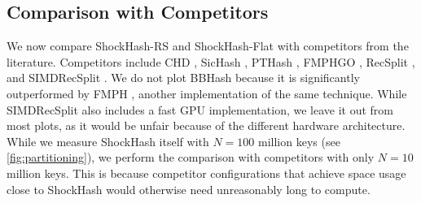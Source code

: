 \documentclass[a4paper,USenglish,cleveref]{lipics-v2021}
\begin{document}
\subsection{Comparison with Competitors}
We now compare ShockHash-RS and ShockHash-Flat with competitors from the literature.
Competitors include CHD \cite{belazzougui2009hash}, SicHash \cite{lehmann2023sichash}, PTHash \cite{pibiri2021pthash}, FMPHGO \cite{beling2023fingerprinting}, RecSplit \cite{esposito2020recsplit}, and SIMDRecSplit \cite{bez2023high}.
We do not plot BBHash \cite{limasset2017fast} because it is significantly outperformed by FMPH \cite{beling2023fingerprinting}, another implementation of the same technique.
While SIMDRecSplit also includes a fast GPU implementation, we leave it out from most plots, as it would be unfair because of the different hardware architecture.
While we measure ShockHash itself with $N=100$ million keys (see \cref{fig:partitioning}), we perform the comparison with competitors with only $N=10$ million keys.
This is because competitor configurations that achieve space usage close to ShockHash would otherwise need unreasonably long to compute.
\end{document}
